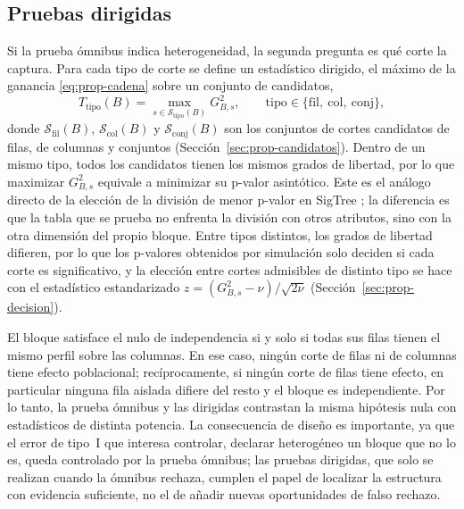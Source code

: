 \subsection{Pruebas dirigidas}

Si la prueba ómnibus indica heterogeneidad, la segunda pregunta es qué corte la
captura. Para cada tipo de corte se define un estadístico dirigido, el máximo de
la ganancia \eqref{eq:prop-cadena} sobre un conjunto de candidatos,
\begin{equation}\label{eq:prop-dirigidos}
  T_{\mathrm{tipo}}(B) = \max_{s\in\mathcal{S}_{\mathrm{tipo}}(B)} G^2_{B,s},
  \qquad \mathrm{tipo}\in\{\mathrm{fil},\ \mathrm{col},\ \mathrm{conj}\},
\end{equation}
donde $\mathcal{S}_{\mathrm{fil}}(B)$, $\mathcal{S}_{\mathrm{col}}(B)$ y
$\mathcal{S}_{\mathrm{conj}}(B)$ son los conjuntos de cortes candidatos de filas,
de columnas y conjuntos (Sección~\ref{sec:prop-candidatos}).
Dentro de un mismo tipo, todos los candidatos tienen los mismos grados de
libertad, por lo que maximizar $G^2_{B,s}$ equivale a minimizar su p-valor
asintótico. Este es el análogo directo de la elección de la división de menor
p-valor en SigTree \citep{Hu2025}; la diferencia es que la tabla que se prueba
no enfrenta la división con otros atributos, sino con la otra dimensión del
propio bloque. Entre tipos distintos, los grados de libertad difieren, por lo
que los p-valores obtenidos por simulación solo deciden si cada corte es
significativo, y la elección entre cortes admisibles de distinto tipo se hace
con el estadístico estandarizado $z = (G^2_{B,s}-\nu)/\sqrt{2\nu}$
(Sección~\ref{sec:prop-decision}).

\begin{observacion}\label{obs:nulo-comun}
El bloque satisface el nulo de independencia si y solo si todas sus filas tienen
el mismo perfil sobre las columnas. En ese caso, ningún corte de filas ni de
columnas tiene efecto poblacional; recíprocamente, si ningún corte de filas
tiene efecto, en particular ninguna fila aislada difiere del resto y el bloque
es independiente. Por lo tanto, la prueba ómnibus y las dirigidas contrastan la
misma hipótesis nula con estadísticos de distinta potencia. La consecuencia de
diseño es importante, ya que el error de tipo~I que interesa controlar, declarar
heterogéneo un bloque que no lo es, queda controlado por la prueba ómnibus; las
pruebas dirigidas, que solo se realizan cuando la ómnibus rechaza, cumplen el
papel de localizar la estructura con evidencia suficiente, no el de
añadir nuevas oportunidades de falso rechazo.
\end{observacion}

